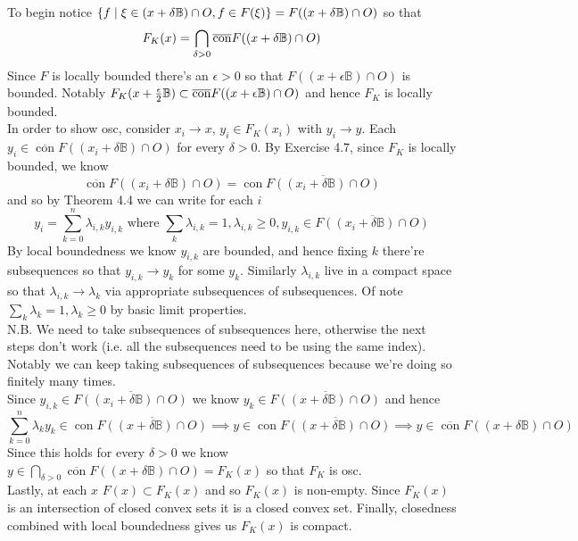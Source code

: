 \documentclass{article}
\newenvironment{ex}[1]
  {\renewcommand\theexercise{#1}\exercise}
  {\endexercise}
\newcommand{\B}{\mathbb{B}}
\DeclareMathOperator*{\con}{con}
\newcommand{\clo}[1]{\overline{#1}}
\begin{document}
\begin{ex}{4.22} %
  To begin notice $\braces{ f \mid \xi \in (x + \delta \B) \cap O, f \in F(\xi) } = F\parens{(x + \delta\B) \cap O}$ so that
  $$
  F_K(x) = \bigcap_{\delta > 0} \clo{\con} F\parens{(x + \delta\B) \cap O}
  $$
  Since $F$ is locally bounded there's an $\epsilon > 0$ so that $F((x + \epsilon \B) \cap O)$ is bounded. Notably $F_K\parens{x + \frac{\epsilon}{2}\B} \subset \clo{\con} F((x + \epsilon\B) \cap O)$ and hence $F_K$ is locally bounded. \,\\

  In order to show osc, consider $x_i \to x$, $y_i \in F_K(x_i)$ with $y_i \to y$. Each $y_i \in \clo{\con} F((x_i + \delta \B) \cap O)$ for every $\delta > 0$. By Exercise 4.7, since $F_K$ is locally bounded, we know
  $$
  \clo{\con} F((x_i + \delta \B) \cap O) = \con \clo{F((x_i + \delta \B) \cap O)}
  $$
  and so by Theorem 4.4 we can write for each $i$
  $$
  y_i = \sum_{k=0}^n \lambda_{i,k} y_{i,k} \text{ where } \sum_k \lambda_{i,k} = 1, \lambda_{i, k} \ge 0, y_{i,k} \in \clo{F((x_i + \delta \B) \cap O)}
  $$
  By local boundedness we know $y_{i,k}$ are bounded, and hence fixing $k$ there're subsequences so that $y_{i,k} \to y_k$ for some $y_k$. Similarly $\lambda_{i,k}$ live in a compact space so that $\lambda_{i,k} \to \lambda_k$ via appropriate subsequences of subsequences. Of note $\sum_k \lambda_k = 1, \lambda_k \ge 0$ by basic limit properties. \, \\

  N.B. We need to take subsequences of subsequences here, otherwise the next steps don't work (i.e. all the subsequences need to be using the same index). Notably we can keep taking subsequences of subsequences because we're doing so finitely many times. \, \\

  Since $y_{i,k} \in \clo{F((x_i + \delta \B) \cap O)}$ we know $y_k \in \clo{F((x + \delta \B) \cap O)}$ and hence
  $$
  \sum_{k=0}^n \lambda_k y_k \in \con \clo{F((x + \delta \B) \cap O)} \implies y \in \con \clo{F((x + \delta \B) \cap O)} \implies y \in \clo{\con} F((x + \delta \B) \cap O)
  $$
  Since this holds for every $\delta > 0$ we know $y \in \bigcap_{\delta > 0} \clo{\con} F((x + \delta \B) \cap O) = F_K(x)$ so that $F_K$ is osc. \, \\

  Lastly, at each $x$ $F(x) \subset F_K(x)$ and so $F_K(x)$ is non-empty. Since $F_K(x)$ is an intersection of closed convex sets it is a closed convex set. Finally, closedness combined with local boundedness gives us $F_K(x)$ is compact.
\end{ex} %
\end{document}
